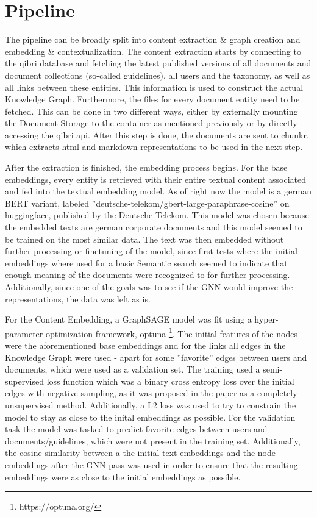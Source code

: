 \documentclass[draft,final]{vutinfth} %
\begin{document}
\section{Pipeline}
The pipeline can be broadly split into content extraction \& graph creation and embedding \& contextualization. The content extraction starts by connecting to the qibri database and fetching the latest published versions of all documents and document collections (so-called guidelines), all users and the taxonomy, as well as all links between these entities. This information is used to construct the actual Knowledge Graph. Furthermore, the files for every document entity need to be fetched. This can be done in two different ways, either by externally mounting the Document Storage to the container as mentioned previously or by directly accessing the qibri api. After this step is done, the documents are sent to chunkr, which extracts html and markdown representations to be used in the next step. 

After the extraction is finished, the embedding process begins. For the base embeddings, every entity is retrieved with their entire textual content associated and fed into the textual embedding model. As of right now the model is a german BERT variant, labeled ''deutsche-telekom/gbert-large-paraphrase-cosine'' on huggingface, published by the Deutsche Telekom.\cite{german_bert} This model was chosen because the embedded texts are german corporate documents and this model seemed to be trained on the most similar data. The text was then embedded without further processing or finetuning of the model, since first tests where the initial embeddings where used for a basic Semantic search seemed to indicate that enough meaning of the documents were recognized to for further processing. Additionally, since one of the goals was to see if the GNN would improve the representations, the data was left as is. 

For the Content Embedding, a GraphSAGE model was fit using a hyper-parameter optimization framework, optuna \footnote{https://optuna.org/}. The initial features of the nodes were the aforementioned base embeddings and for the links all edges in the  Knowledge Graph were used - apart for some ''favorite'' edges between users and documents, which were used as a validation set.  The training used a semi-supervised loss function which was a binary cross entropy loss over the initial edges with negative sampling, as it was proposed in the paper as a completely unsupervised method. Additionally, a L2 loss was used to try to constrain the model to stay as close to the inital embeddings as possible. For the validation task the model was tasked to predict favorite edges between users and documents/guidelines, which were not present in the training set. Additionally, the cosine similarity between a the initial text embeddings and the node embeddings after the GNN pass was used in order to ensure that the resulting embeddings were as close to the initial embeddings as possible. 
\end{document}
